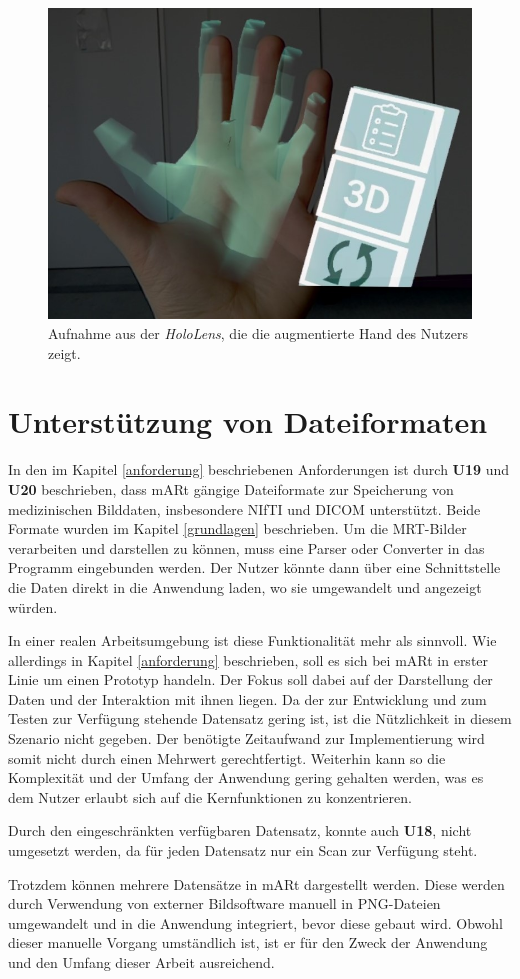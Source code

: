 \begin{figure}[!htb]
	\centering
	\includegraphics[width=0.5\linewidth]{images/AR_hand.jpg}
	\caption{Aufnahme aus der \textit{HoloLens}, die die augmentierte Hand des Nutzers zeigt.}
	\label{img:handUI}
\end{figure}
\FloatBarrier


\section{Unterstützung von Dateiformaten} 

In den im Kapitel \ref{anforderung} beschriebenen Anforderungen ist durch \textbf{U19} und \textbf{U20} beschrieben, dass mARt gängige Dateiformate zur Speicherung von medizinischen Bilddaten, insbesondere NIfTI und DICOM unterstützt. Beide Formate wurden im Kapitel \ref{grundlagen} beschrieben. 
Um die MRT-Bilder verarbeiten und darstellen zu können, muss eine Parser oder Converter in das Programm eingebunden werden. 
Der Nutzer könnte dann über eine Schnittstelle die Daten direkt in die Anwendung laden, wo sie umgewandelt und angezeigt würden. 

In einer realen Arbeitsumgebung ist diese Funktionalität mehr als sinnvoll. Wie allerdings in Kapitel \ref{anforderung} beschrieben, soll es sich bei mARt in erster Linie um einen Prototyp handeln.
Der Fokus soll dabei auf der Darstellung der Daten und der Interaktion mit ihnen liegen. Da der zur Entwicklung und zum Testen zur Verfügung stehende Datensatz gering ist, ist die Nützlichkeit in diesem Szenario nicht gegeben. Der benötigte Zeitaufwand zur Implementierung wird somit nicht durch einen Mehrwert gerechtfertigt.
Weiterhin kann so die Komplexität und der Umfang der Anwendung gering gehalten werden, was es dem Nutzer erlaubt sich auf die Kernfunktionen zu konzentrieren. 

Durch den eingeschränkten verfügbaren Datensatz, konnte auch \textbf{U18}, nicht umgesetzt werden, da für jeden Datensatz nur ein Scan zur Verfügung steht.


Trotzdem können mehrere Datensätze in mARt dargestellt werden. Diese werden durch Verwendung von externer Bildsoftware manuell in PNG-Dateien umgewandelt und in die Anwendung integriert, bevor diese gebaut wird. 
Obwohl dieser manuelle Vorgang umständlich ist, ist er für den Zweck der Anwendung und den Umfang dieser Arbeit ausreichend.
